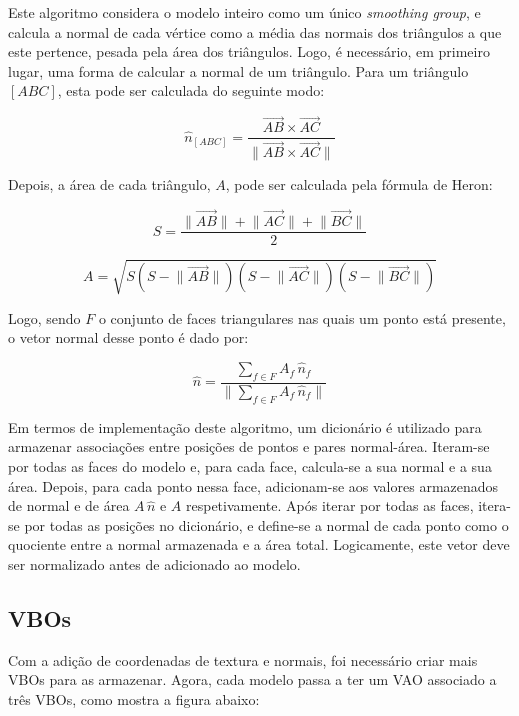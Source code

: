 \documentclass[12pt, a4paper]{article}
\begin{document}
Este algoritmo considera o modelo inteiro como um único \emph{smoothing group}, e calcula a normal
de cada vértice como a média das normais dos triângulos a que este pertence, pesada pela área dos
triângulos. Logo, é necessário, em primeiro lugar, uma forma de calcular a normal de um triângulo.
Para um triângulo $[ABC]$, esta pode ser calculada do seguinte modo:

$$
\hat{n}_{[ABC]} = \frac{
    \overrightarrow{AB} \times \overrightarrow{AC}
}{
    \lVert \overrightarrow{AB} \times \overrightarrow{AC} \rVert
}
$$

Depois, a área de cada triângulo, $A$, pode ser calculada pela fórmula de Heron:

$$
S = \frac{
    \lVert \overrightarrow{AB} \rVert +
    \lVert \overrightarrow{AC} \rVert +
    \lVert \overrightarrow{BC} \rVert
}{
    2
}
$$

$$
A = \sqrt{
    S
    \left ( S - \lVert \overrightarrow{AB} \rVert \right )
    \left ( S - \lVert \overrightarrow{AC} \rVert \right )
    \left ( S - \lVert \overrightarrow{BC} \rVert \right )
}
$$

Logo, sendo $F$ o conjunto de faces triangulares nas quais um ponto está presente, o vetor normal
desse ponto é dado por:

$$
\hat{n} = \frac{
    \sum_{f \in F} {A_f \, \hat{n}_f}
}{
    \lVert \sum_{f \in F} {A_f \, \hat{n}_f} \rVert
}
$$

Em termos de implementação deste algoritmo, um dicionário é utilizado para armazenar associações
entre posições de pontos e pares normal-área. Iteram-se por todas as faces do modelo e, para
cada face, calcula-se a sua normal e a sua área. Depois, para cada ponto nessa face, adicionam-se
aos valores armazenados de normal e de área $A \, \hat{n}$ e $A$ respetivamente. Após iterar por
todas as faces, itera-se por todas as posições no dicionário, e define-se a normal de cada ponto
como o quociente entre a normal armazenada e a área total. Logicamente, este vetor deve ser
normalizado antes de adicionado ao modelo.

\subsection{VBOs}

Com a adição de coordenadas de textura e normais, foi necessário criar mais VBOs para as armazenar.
Agora, cada modelo passa a ter um VAO associado a três VBOs, como mostra a figura abaixo:
\end{document}
